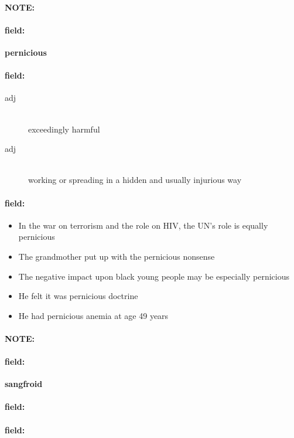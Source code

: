 \documentclass[12pt]{article}
\newenvironment{note}{\paragraph{NOTE:}}{}
\newenvironment{field}{\paragraph{field:}}{}
\begin{document}
\begin{note}
\begin{field}
\textbf{\large pernicious}
\end{field}


\begin{field}
\begin{description}
\item[adj] \hfill \\ 
exceedingly harmful

\item[adj] \hfill \\ 
working or spreading in a hidden and usually injurious way

\end{description}
\end{field}

\begin{field}
\begin{itemize}
\item In the war on terrorism and the role on HIV, the UN's role is equally pernicious
\item The grandmother put up with the pernicious nonsense
\item The negative impact upon black young people may be especially pernicious
\item He felt it was pernicious doctrine
\item He had pernicious anemia at age 49 years
\end{itemize}
\end{field}
\end{note}
\begin{note}
\begin{field}
\textbf{\large sangfroid}
\end{field}


\begin{field}
\end{field}

\begin{field}
\end{field}
\end{note}
\end{document}
